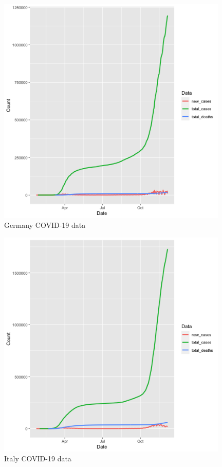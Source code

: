 \documentclass[11pt]{article}
\begin{document}
\begin{figure}[!h]
\centering
  \includegraphics[width=110mm]{R-Code/plots/germanyCovid.png}   
  \caption{Germany COVID-19 data}
  \end{figure}

\begin{figure}[!h]
\centering
  \includegraphics[width=110mm]{R-Code/plots/italyCovid.png}  
  \caption{Italy COVID-19 data}
  \end{figure}
\end{document}
